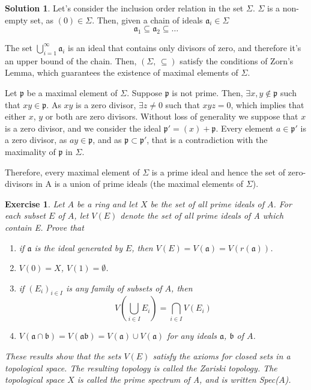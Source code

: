 \documentclass[12pt]{article}
\newtheorem{ex}{Exercise}[section]
\theoremstyle{definition}
\newtheorem*{sol}{Solution}
\begin{document}
\begin{sol}
	Let's consider the inclusion order relation in the set $\Sigma$. $\Sigma$ is a non-empty set, as $(0) \in \Sigma$. Then, given a chain of ideals $\mathfrak{a}_i \in \Sigma$
	\[
		\mathfrak{a}_1 \subseteq \mathfrak{a}_2 \subseteq \dots
	\]

	The set $\bigcup_{i=1}^\infty \mathfrak{a}_i$ is an ideal that contains only divisors of zero, and therefore it's an upper bound of the chain. Then, $(\Sigma, \, \subseteq)$ satisfy the conditions of Zorn's Lemma, which guarantees the existence of maximal elements of $\Sigma$.

	Let $\mathfrak{p}$ be a maximal element of $\Sigma$. Suppose $\mathfrak{p}$ is not prime. Then, $\exists x,y \notin \mathfrak{p}$ such that $xy \in \mathfrak{p}$. As $xy$ is a zero divisor, $\exists z \neq 0$ such that $xyz = 0$, which implies that either $x$, $y$ or both are zero divisors. Without loss of generality we suppose that $x$ is a zero divisor, and we consider the ideal $\mathfrak{p}' = (x) + \mathfrak{p}$. Every element $a \in \mathfrak{p}'$ is a zero divisor, as $ay \in \mathfrak{p}$, and as $\mathfrak{p} \subset \mathfrak{p}'$, that is a contradiction with the maximality of $\mathfrak{p}$ in $\Sigma$.

	Therefore, every maximal element of $\Sigma$ is a prime ideal and hence the set of zero-divisors in A is a union of prime ideals (the maximal elements of $\Sigma$).
\end{sol}

\begin{ex}
	Let $A$ be a ring and let $X$ be the set of all prime ideals of $A$. For each subset $E$ of $A$, let $V(E)$ denote the set of all prime ideals of A which contain E. Prove that
	\begin{enumerate}[label=(\roman*)]
		\item if $\mathfrak{a}$ is the ideal generated by $E$, then $V(E) = V(\mathfrak{a}) = V(r(\mathfrak{a}))$.
		\item $V(0) = X$, $V(1) = \emptyset$.
		\item if $(E_i)_{i \in I}$ is any family of subsets of $A$, then
			\[
				V \left ( \bigcup_{i \in I} E_i \right ) = \bigcap_{i \in I} V(E_i)
			\]
		\item $V(\mathfrak{a} \cap \mathfrak{b}) = V(\mathfrak{a}\mathfrak{b}) = V(\mathfrak{a}) \cup V(\mathfrak{a})$ for any ideals $\mathfrak{a}$, $\mathfrak{b}$ of $A$.
	\end{enumerate}

	These results show that the sets $V(E)$ satisfy the axioms for closed sets in a topological space. The resulting topology is called the \textit{Zariski topology}. The topological space $X$ is called the \textit{prime spectrum} of A, and is written Spec($A$).
\end{ex}
\end{document}

